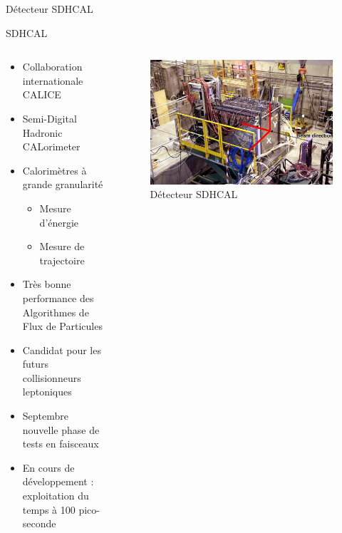 \documentclass[9pt]{beamer}
\begin{document}
\begin{frame}{Détecteur SDHCAL}
    \begin{block}{SDHCAL}

        \begin{columns}
            \begin{column}{0.5\textwidth}
                \begin{itemize}
                    \item Collaboration internationale CALICE
                    \item Semi-Digital Hadronic CALorimeter
                    \item Calorimètres à grande granularité
                    \begin{itemize}
                        \item Mesure d'énergie
                        \item Mesure de trajectoire
                        
                    \end{itemize}
                    \item Très bonne performance des Algorithmes de Flux de Particules
                    \item Candidat pour les futurs collisionneurs leptoniques
                    \item Septembre nouvelle phase de tests en faisceaux
                    \item En cours de développement : exploitation du temps à 100 pico-seconde
                \end{itemize}
            \end{column}
	
            \begin{column}{0.45\textwidth}
                \begin{figure}
                    \center
                    \includegraphics[width=\textwidth]{../img/SDHCAL.png}
                    \caption{Détecteur SDHCAL}
                    \label{detector}
                \end{figure}
            \end{column}
        \end{columns}
    \end{block}
\end{frame}
\end{document}
